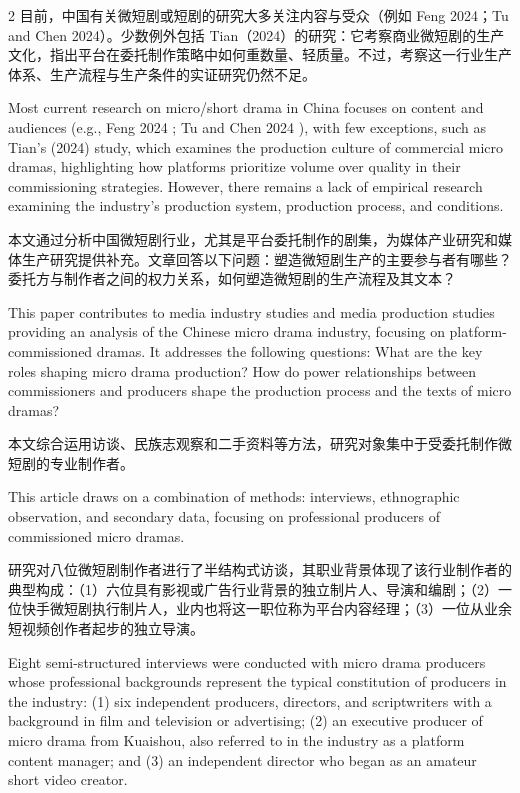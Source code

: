 \documentclass[10pt,a4paper]{article}
\begin{document}
\begin{paracol}{2}
\switchcolumn*
目前，中国有关微短剧或短剧的研究大多关注内容与受众（例如 Feng 2024；Tu and Chen 2024）。少数例外包括 Tian（2024）的研究：它考察商业微短剧的生产文化，指出平台在委托制作策略中如何重数量、轻质量。不过，考察这一行业生产体系、生产流程与生产条件的实证研究仍然不足。\par
\switchcolumn
Most current research on micro/short drama in China focuses on content and audiences (e.g., Feng 2024 ; Tu and Chen 2024 ), with few exceptions, such as Tian’s (2024) study, which examines the production culture of commercial micro dramas, highlighting how platforms prioritize volume over quality in their commissioning strategies. However, there remains a lack of empirical research examining the industry’s production system, production process, and conditions.\par
\switchcolumn*
本文通过分析中国微短剧行业，尤其是平台委托制作的剧集，为媒体产业研究和媒体生产研究提供补充。文章回答以下问题：塑造微短剧生产的主要参与者有哪些？委托方与制作者之间的权力关系，如何塑造微短剧的生产流程及其文本？\par
\switchcolumn
This paper contributes to media industry studies and media production studies providing an analysis of the Chinese micro drama industry, focusing on platform-commissioned dramas. It addresses the following questions: What are the key roles shaping micro drama production? How do power relationships between commissioners and producers shape the production process and the texts of micro dramas?\par
\switchcolumn*
本文综合运用访谈、民族志观察和二手资料等方法，研究对象集中于受委托制作微短剧的专业制作者。\par
\switchcolumn
This article draws on a combination of methods: interviews, ethnographic observation, and secondary data, focusing on professional producers of commissioned micro dramas.\par
\switchcolumn*
研究对八位微短剧制作者进行了半结构式访谈，其职业背景体现了该行业制作者的典型构成：（1）六位具有影视或广告行业背景的独立制片人、导演和编剧；（2）一位快手微短剧执行制片人，业内也将这一职位称为平台内容经理；（3）一位从业余短视频创作者起步的独立导演。\par
\switchcolumn
Eight semi-structured interviews were conducted with micro drama producers whose professional backgrounds represent the typical constitution of producers in the industry: (1) six independent producers, directors, and scriptwriters with a background in film and television or advertising; (2) an executive producer of micro drama from Kuaishou, also referred to in the industry as a platform content manager; and (3) an independent director who began as an amateur short video creator.\par

\end{paracol}
\end{document}
